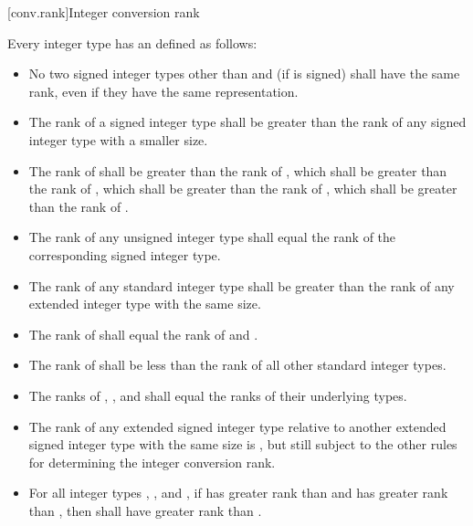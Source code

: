 [conv.rank]{Integer conversion rank}%

\pnum
Every integer type has an  defined as follows:

\begin{itemize}
\item No two signed integer types other than  and  (if  is signed) shall have the same rank, even if they have
the same representation.

\item The rank of a signed integer type shall be greater than the rank
of any signed integer type with a smaller size.

\item The rank of  shall be greater
than the rank of , which shall be greater than
the rank of , which shall be greater than the rank of
, which shall be greater than the rank of
.

\item The rank of any unsigned integer type shall equal the rank of the
corresponding signed integer type.

\item The rank of any standard integer type shall be greater than the
rank of any extended integer type with the same size.

\item The rank of  shall equal the rank of 
and .

\item The rank of  shall be less than the rank of all other
standard integer types.

%
%
%
\item The ranks of , , and
 shall equal the ranks of their underlying
types.

\item The rank of any extended signed integer type relative to another
extended signed integer type with the same size is , but still subject to the other rules for determining the integer
conversion rank.

\item For all integer types , , and , if
 has greater rank than  and  has greater
rank than , then  shall have greater rank than
.
\end{itemize}


